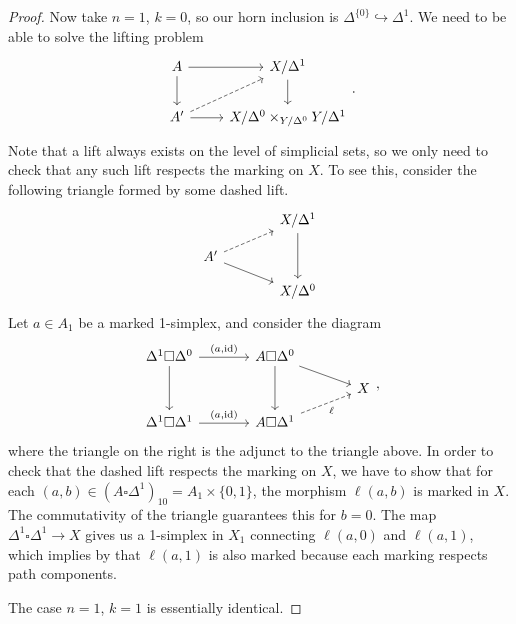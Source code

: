 \documentclass[main.tex]{subfiles}
\begin{document}
\begin{proof}
  Now take $n = 1$, $k = 0$, so our horn inclusion is $\Delta^{\{0\}} \hookrightarrow \Delta^{1}$. We need to be able to solve the lifting problem
  \begin{equation*}
    \begin{tikzcd}
      A
      \arrow[r]
      \arrow[d]
      & X / \Delta^{1}
      \arrow[d]
      \\
      A'
      \arrow[r]
      \arrow[ur, dashed]
      & X / \Delta^{0} \times_{Y / \Delta^{0}} Y / \Delta^{1}
    \end{tikzcd}.
  \end{equation*}
  Note that a lift always exists on the level of simplicial sets, so we only need to check that any such lift respects the marking on $X$. To see this, consider the following triangle formed by some dashed lift.
  \begin{equation*}
    \begin{tikzcd}[row sep=small, column sep=large]
      & X / \Delta^{1}
      \arrow[dd]
      \\
      A'
      \arrow[ur, dashed]
      \arrow[dr]
      \\
      & X / \Delta^{0}
    \end{tikzcd}
  \end{equation*}
  Let $a \in A_{1}$ be a marked 1-simplex, and consider the diagram
  \begin{equation*}
    \begin{tikzcd}[row sep=small, column sep=large]
      \Delta^{1} \square \Delta^{0}
      \arrow[r, "{(a, \id)}"]
      \arrow[dd]
      & A \square \Delta^{0}
      \arrow[dd]
      \arrow[dr]
      \\
      && X
      \\
      \Delta^{1} \square \Delta^{1}
      \arrow[r, "{(a, \id)}"]
      & A \square \Delta^{1}
      \arrow[ur, dashed, swap, "\ell"]
    \end{tikzcd},
  \end{equation*}
  where the triangle on the right is the adjunct to the triangle above. In order to check that the dashed lift respects the marking on $X$, we have to show that for each $(a, b) \in (A \square \Delta^{1})_{10} = A_{1} \times \{0, 1\}$, the morphism $\ell(a, b)$ is marked in $X$. The commutativity of the triangle guarantees this for $b = 0$. The map $\Delta^{1} \square \Delta^{1} \to X$ gives us a 1-simplex in $X_{1}$ connecting $\ell(a, 0)$ and $\ell(a, 1)$, which implies by that $\ell(a, 1)$ is also marked because each marking respects path components.

  The case $n = 1$, $k = 1$ is essentially identical.
\end{proof}
\end{document}
